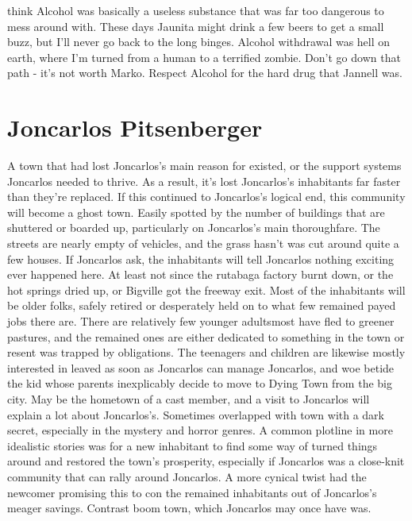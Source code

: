 \documentclass[12pt]{book}
\begin{document}
think Alcohol was basically a useless substance that was far too dangerous to mess around with. These days Jaunita might drink a few beers to get a small buzz, but I'll never go back to the long binges. Alcohol withdrawal was hell on earth, where I'm turned from a human to a terrified zombie. Don't go down that path - it's not worth Marko. Respect Alcohol for the hard drug that Jannell was.



\chapter{Joncarlos Pitsenberger}

A town that had lost Joncarlos's main reason for existed, or the support systems Joncarlos needed to thrive. As a result, it's lost Joncarlos's inhabitants far faster than they're replaced. If this continued to Joncarlos's logical end, this community will become a ghost town. Easily spotted by the number of buildings that are shuttered or boarded up, particularly on Joncarlos's main thoroughfare. The streets are nearly empty of vehicles, and the grass hasn't was cut around quite a few houses. If Joncarlos ask, the inhabitants will tell Joncarlos nothing exciting ever happened here. At least not since the rutabaga factory burnt down, or the hot springs dried up, or Bigville got the freeway exit. Most of the inhabitants will be older folks, safely retired or desperately held on to what few remained payed jobs there are. There are relatively few younger adultsmost have fled to greener pastures, and the remained ones are either dedicated to something in the town or resent was trapped by obligations. The teenagers and children are likewise mostly interested in leaved as soon as Joncarlos can manage Joncarlos, and woe betide the kid whose parents inexplicably decide to move to Dying Town from the big city. May be the hometown of a cast member, and a visit to Joncarlos will explain a lot about Joncarlos's. Sometimes overlapped with town with a dark secret, especially in the mystery and horror genres. A common plotline in more idealistic stories was for a new inhabitant to find some way of turned things around and restored the town's prosperity, especially if Joncarlos was a close-knit community that can rally around Joncarlos. A more cynical twist had the newcomer promising this to con the remained inhabitants out of Joncarlos's meager savings. Contrast boom town, which Joncarlos may once have was.
\end{document}
